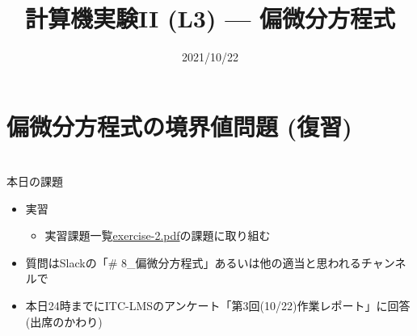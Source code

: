 \documentclass[10pt,dvipdfmx]{beamer}
\title{計算機実験II (L3) --- 偏微分方程式}
\date{2021/10/22}
\begin{document}
\begin{frame}
  \titlepage
  \tableofcontents
\end{frame}



%
%
%

%
%
%

\section{偏微分方程式の境界値問題 (復習)}







\section{}
\begin{frame}[t]{本日の課題}
  \begin{itemize}
  \item 実習
    \begin{itemize}
    \item 実習課題一覧\href{https://github.com/todo-group/ComputerExperiments/releases/tag/2021a-computer2}{exercise-2.pdf}の課題に取り組む
    \end{itemize}
  \item 質問はSlackの「\# 8\_偏微分方程式」あるいは他の適当と思われるチャンネルで
  \item 本日24時までにITC-LMSのアンケート「第3回(10/22)作業レポート」に回答(出席のかわり)
  \end{itemize}
\end{frame}
\end{document}

